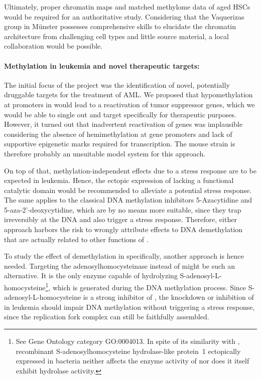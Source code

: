 Ultimately, proper chromatin maps and matched methylome data of aged \dnmtchip HSCs would be required for an authoritative study. Considering that the Vaquerizas group in Münster possesses comprehensive skills to elucidate the chromatin architecture from challenging cell types and little source material\cite{Hug2017}, a local collaboration would be possible. \clearpage   

\paragraph{Methylation in \mllafnine leukemia and novel therapeutic targets:} The initial focus of the project was the identification of novel, potentially druggable targets for the treatment of AML. We proposed that hypomethylation at promoters in \dnmtchip would lead to a reactivation of tumor suppressor genes, which we would be able to single out and target specifically for therapeutic purposes. However, it turned out that inadvertent reactivation of genes was implausible considering the absence of hemimethylation at gene promoters and lack of supportive epigenetic marks required for transcription. The \dnmtchip mouse strain is therefore probably an unsuitable model system for this approach. 

On top of that, methylation-independent effects due to a stress response are to be expected in \dnmtchip leukemia. Hence, the ectopic expression of  lacking a functional catalytic domain would be recommended to alleviate a potential stress response. The same applies to the classical DNA methylation inhibitors 5-Azacytidine and 5-aza-2'-deoxycytidine, which are by no means more suitable, since they trap  irreversibly at the DNA\cite{Juettermann1994} and also trigger a stress response\cite{Christman2002}. Therefore, either approach harbors the risk to wrongly attribute effects to DNA demethylation that are actually related to other functions of \cite{Juettermann1994}.     

To study the effect of demethylation in \mllafnine specifically, another approach is hence needed. Targeting the adenosylhomocysteinase \cite{Turner1998,Fumic2007} instead of  might be such an alternative. It is the only enzyme capable of hydrolyzing S-adeno\-syl-L-homo\-cysteine\footnote{\raggedright See Gene Ontology category GO:0004013. In spite of its similarity with , recombinant S-adenosylhomocysteine hydrolase-like protein~1  ectopically expressed in bacteria neither affects the enzyme activity of  nor does it itself exhibit hydrolase activity\cite{Ando2003}.}, which is generated during the DNA methylation process\cite{Yang2003}. Since S-adenosyl-L-homocysteine is a strong inhibitor of , the knockdown or inhibition of  in \mllafnine leukemia should impair DNA methylation without triggering a stress response, since the replication fork complex can still be faithfully assembled.   

